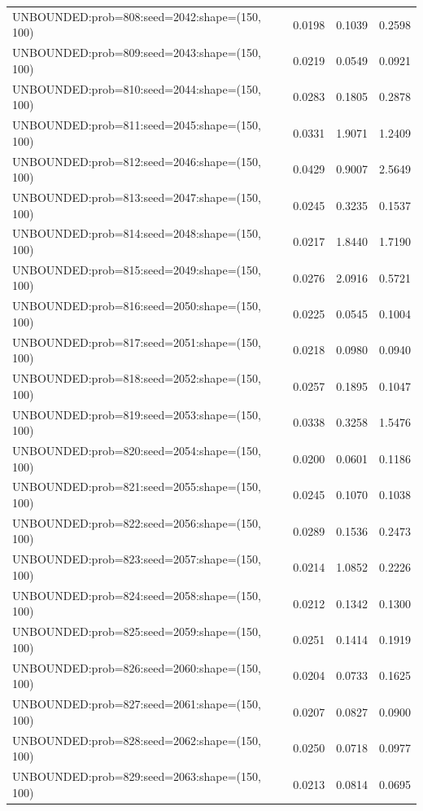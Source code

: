 \begin{longtable}{lccc}
UNBOUNDED:prob=808:seed=2042:shape=(150, 100) &   0.0198 &  0.1039 &  0.2598 \\
UNBOUNDED:prob=809:seed=2043:shape=(150, 100) &   0.0219 &  0.0549 &  0.0921 \\
UNBOUNDED:prob=810:seed=2044:shape=(150, 100) &   0.0283 &  0.1805 &  0.2878 \\
UNBOUNDED:prob=811:seed=2045:shape=(150, 100) &   0.0331 &  1.9071 &  1.2409 \\
UNBOUNDED:prob=812:seed=2046:shape=(150, 100) &   0.0429 &  0.9007 &  2.5649 \\
UNBOUNDED:prob=813:seed=2047:shape=(150, 100) &   0.0245 &  0.3235 &  0.1537 \\
UNBOUNDED:prob=814:seed=2048:shape=(150, 100) &   0.0217 &  1.8440 &  1.7190 \\
UNBOUNDED:prob=815:seed=2049:shape=(150, 100) &   0.0276 &  2.0916 &  0.5721 \\
UNBOUNDED:prob=816:seed=2050:shape=(150, 100) &   0.0225 &  0.0545 &  0.1004 \\
UNBOUNDED:prob=817:seed=2051:shape=(150, 100) &   0.0218 &  0.0980 &  0.0940 \\
UNBOUNDED:prob=818:seed=2052:shape=(150, 100) &   0.0257 &  0.1895 &  0.1047 \\
UNBOUNDED:prob=819:seed=2053:shape=(150, 100) &   0.0338 &  0.3258 &  1.5476 \\
UNBOUNDED:prob=820:seed=2054:shape=(150, 100) &   0.0200 &  0.0601 &  0.1186 \\
UNBOUNDED:prob=821:seed=2055:shape=(150, 100) &   0.0245 &  0.1070 &  0.1038 \\
UNBOUNDED:prob=822:seed=2056:shape=(150, 100) &   0.0289 &  0.1536 &  0.2473 \\
UNBOUNDED:prob=823:seed=2057:shape=(150, 100) &   0.0214 &  1.0852 &  0.2226 \\
UNBOUNDED:prob=824:seed=2058:shape=(150, 100) &   0.0212 &  0.1342 &  0.1300 \\
UNBOUNDED:prob=825:seed=2059:shape=(150, 100) &   0.0251 &  0.1414 &  0.1919 \\
UNBOUNDED:prob=826:seed=2060:shape=(150, 100) &   0.0204 &  0.0733 &  0.1625 \\
UNBOUNDED:prob=827:seed=2061:shape=(150, 100) &   0.0207 &  0.0827 &  0.0900 \\
UNBOUNDED:prob=828:seed=2062:shape=(150, 100) &   0.0250 &  0.0718 &  0.0977 \\
UNBOUNDED:prob=829:seed=2063:shape=(150, 100) &   0.0213 &  0.0814 &  0.0695 \\

\end{longtable}
